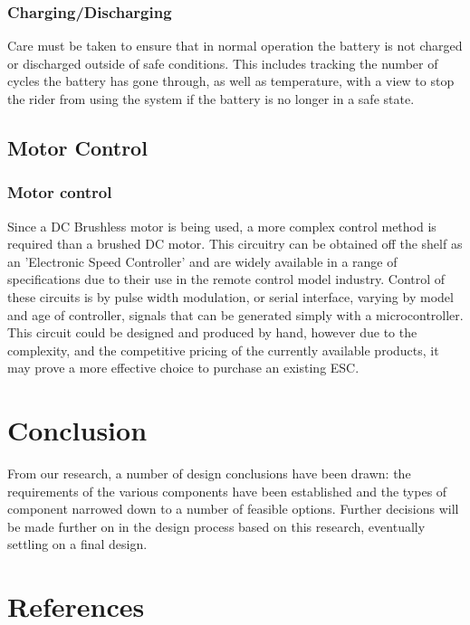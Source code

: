 \documentclass[journal,10pt]{IEEEtran}
\begin{document}
    	\subsubsection{Charging/Discharging}
    	Care must be taken to ensure that in normal operation the battery is not charged or discharged outside of safe conditions.
    	This includes tracking the number of cycles the battery has gone through, as well as temperature, with a view to stop the rider from using the system if the battery is no longer in a safe state.
    	
    \subsection{Motor Control}
    	\subsubsection{Motor control}
    		Since a DC Brushless motor is being used, a more complex control method is required than a brushed DC motor.
    		This circuitry can be obtained off the shelf as an 'Electronic Speed Controller' and are widely available in a range of specifications due to their use in the remote control model industry.
    		Control of these circuits is by pulse width modulation, or serial interface, varying by model and age of controller, signals that can be generated simply with a microcontroller.
    		This circuit could be designed and produced by hand, however due to the complexity, and the competitive pricing of the currently available products, it may prove a more effective choice to purchase an existing ESC.
\section{Conclusion}
From our research, a number of design conclusions have been drawn: the requirements of the various components have been established and the types of component narrowed down to a number of feasible options. Further decisions will be made further on in the design process based on this research, eventually settling on a final design.
\section{References}
\end{document}
